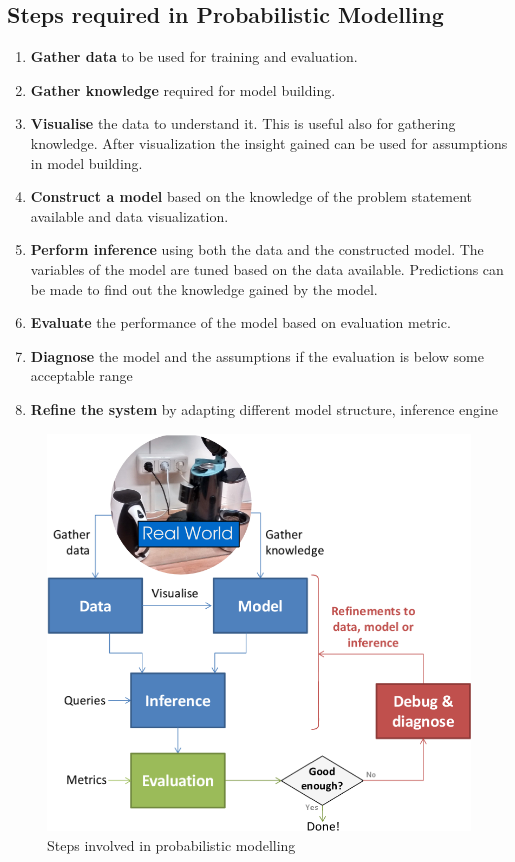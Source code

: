 \subsection*{Steps required in Probabilistic Modelling}
\label{sub:steps}
\begin{enumerate}
	\item \textbf{Gather data} to be used for training and evaluation.
    \item \textbf{Gather knowledge} required for model building.
    \item \textbf{Visualise} the data to understand it. This is useful also for gathering knowledge. After visualization the insight gained can be used for assumptions in model building.
    \item \textbf{Construct a model} based on the knowledge of the problem statement available and data visualization. 
    \item \textbf{Perform inference} using both the data and the constructed model. The variables of the model are tuned based on the data available. Predictions can be made to find out the knowledge gained by the model.
    \item \textbf{Evaluate} the performance of the model based on evaluation metric.
    \item \textbf{Diagnose} the model and the assumptions if the evaluation is below some acceptable range
    \item \textbf{Refine the system} by adapting different model structure, inference engine

\end{enumerate}


\begin{figure}[htp]
\centering
\includegraphics[scale=0.5]{pictures/Lifecycle.png}
\caption{Steps involved in probabilistic modelling  \protect\footnotemark }
\label{}
\end{figure}

